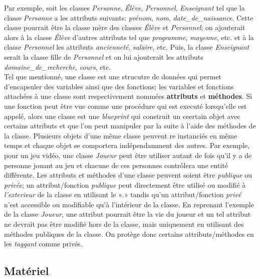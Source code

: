\documentclass[]{report}
\begin{document}
\begin{adjustwidth}{1.5cm}{0cm}
Par exemple, soit les classes \textit{Personne}, \textit{Élève}, \textit{Personnel}, \textit{Enseignant} tel que la classe \textit{Personne} a les attributs suivants: \textit{prénom}, \textit{nom}, \textit{date\_de\_naissance}. Cette classe pourrait être la classe mère des classes \textit{Élève} et \textit{Personnel}; on ajouterait alors à la classe \textit{Élève} d'autres attributs tel que \textit{programme}, \textit{moyenne}, etc. et à la classe \textit{Personnel} les attributs \textit{ancienneté}, \textit{salaire}, etc. Puis, la classe \textit{Enseignant} serait la classe fille de \textit{Personnel} et on lui ajouterait les attributs \textit{domaine\_de\_recherche}, \textit{cours}, etc.
\\

Tel que mentionné, une classe est une strucutre de données qui permet d'encapsuler des variables ainsi que des fonctions; les variables et fonctions attachées à une classe sont respectivement nommées \textbf{attributs} et \textbf{méthodes}. Si une fonction peut être vue comme une procédure qui est executé lorsqu'elle est appelé, alors une classe est une \textit{blueprint} qui construit un ceertain objet avec certains attributs et que l'on peut manipuler par la suite à l'aide des méthodes de la classe. Plusieurs objets d'une même classe peuvent re instanciés en même temps et chaque objet se comportera indépendamment des autres. Par exemple, pour un jeu vidéo, une classe \textit{Joueur} peut être utiliser autant de fois qu'il y a de personne jouant au jeu et chacune de ces personnes contrôlera une entité différente. Les attributs et méthodes d'une classe peuvent soient être \textit{publique} ou \textit{privée}; un attribut/fonction \textit{publique} peut directement être utilisé ou modifié à \textit{l'exterieur} de la classe en utilisant le «.» tandis qu'un attribut/fonction \textit{privé} n'est accessible ou modifiable qu'à l'intérieur de la classe. En reprenant l'exemple de la classe \textit{Joueur}, une attribut pourrait être la vie du joueur et un tel attribut ne devrait pas être modifié hors de la classe, mais uniquement en utilisant des méthodes publiques de la classe. On protège donc certains attributs/méthodes en les \textit{taggant} comme privés.

\subsection*{\Large{Matériel}}
\vspace{-5mm}\makebox[0.917\textwidth]{\hrulefill}\vspace{3mm}


\end{adjustwidth}
\end{document}
